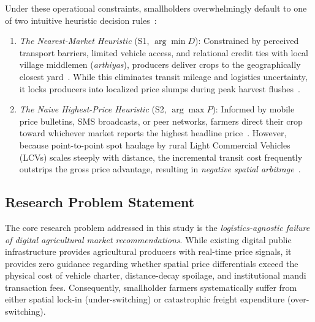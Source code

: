 \documentclass[journal]{IEEEtran}
\begin{document}
Under these operational constraints, smallholders overwhelmingly default to one of two intuitive heuristic decision rules~\cite{goyal2010information, fafchamps2012impact}:
\begin{enumerate}
    \item \textit{The Nearest-Market Heuristic} (S1, $\arg\min D$): Constrained by perceived transport barriers, limited vehicle access, and relational credit ties with local village middlemen (\textit{arthiyas}), producers deliver crops to the geographically closest yard~\cite{mitra2018asymmetric}. While this eliminates transit mileage and logistics uncertainty, it locks producers into localized price slumps during peak harvest flushes~\cite{chatterjee2023market}.
    \item \textit{The Naive Highest-Price Heuristic} (S2, $\arg\max P$): Informed by mobile price bulletins, SMS broadcasts, or peer networks, farmers direct their crop toward whichever market reports the highest headline price~\cite{goyal2010information}. However, because point-to-point spot haulage by rural Light Commercial Vehicles (LCVs) scales steeply with distance, the incremental transit cost frequently outstrips the gross price advantage, resulting in \textit{negative spatial arbitrage}~\cite{chatterjee2023market, takayama1971spatial}.
\end{enumerate}

\subsection{Research Problem Statement}
The core research problem addressed in this study is the \textit{logistics-agnostic failure of digital agricultural market recommendations}. While existing digital public infrastructure provides agricultural producers with real-time price signals, it provides zero guidance regarding whether spatial price differentials exceed the physical cost of vehicle charter, distance-decay spoilage, and institutional mandi transaction fees. Consequently, smallholder farmers systematically suffer from either spatial lock-in (under-switching) or catastrophic freight expenditure (over-switching).
\end{document}
